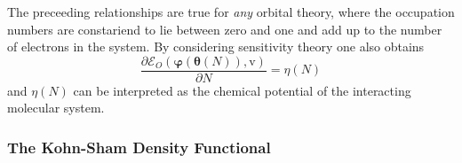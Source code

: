 \documentclass[aps,preprint]{revtex4}%
\begin{document}
The preceeding relationships are true for \emph{any} orbital theory, where the
occupation numbers are constariend to lie between zero and one and add up to
the number of electrons in the system. By considering sensitivity theory one
also obtains
\begin{equation}
\frac{\partial\mathcal{E}_{O}\left(  \mathbf{\varphi}\left(  \mathbf{\theta
}\left(  N\right)  \right)  \mathbf{,}\mathrm{v}\right)  }{\partial N}%
=\eta\left(  N\right)
\end{equation}
and $\eta\left(  N\right)  $ can be interpreted as the chemical potential of
the interacting molecular system.

\subsubsection{The Kohn-Sham Density Functional}
\end{document}
